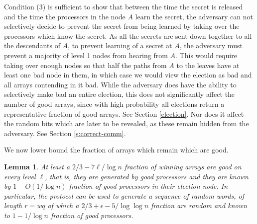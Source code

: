 \documentclass[letterpaper,11pt]{article}
\newtheorem{lemma}{Lemma}
\begin{document}
 Condition (3) is sufficient to show that  between the time the secret is released and the time the processors in the node $A$  learn the secret, the adversary can not selectively decide to prevent the secret from being learned by taking over the processors which know the secret.  As all the secrets are sent down together to all the descendants of $A$, to prevent learning of a secret at $A$, the adversary must prevent a majority of level 1 nodes from hearing from $A$. This would require taking over enough nodes so that half the paths from $A$ to the leaves have at least one bad node in them, in which case we would view the election as bad and all arrays contending in it  bad.  While the adversary does have the ability to selectively make bad an entire election, this does not significantly affect the number of good arrays, since with high probability all elections return a representative fraction of good arrays.  See  Section \ref{election}. Nor does it affect the random bits which are later to be revealed, as these remain hidden from the adversary.  See  Section \ref{s:correct-comm}.

We  now lower  bound the fraction of arrays which remain which are good.

\begin{lemma}
At least a $2/3- 7 \ell /\log n  $ fraction of  winning arrays are good on every level $\ell$, that is, they are generated by good processors and
they are known by $1-O(1/\log n)$ fraction of good processors in their election node. 
In particular, the protocol can be used to generate a sequence of random words, of length $r=wq$ of which a $2/3 + \epsilon - 5 /\log \log  n$ fraction are random and known to $1-1/\log n$ fraction of good processors. 
\end{lemma}
\end{document}
